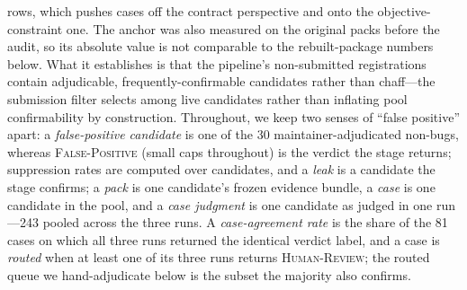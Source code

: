 \documentclass[acmsmall,screen,review,anonymous]{acmart}
\begin{document}
rows, which pushes cases off the contract perspective and onto the objective-constraint one. The anchor was also measured on the original packs before the audit, so its absolute value is not comparable to the rebuilt-package numbers below. What it establishes is that the pipeline's non-submitted registrations contain adjudicable, frequently-confirmable candidates rather than chaff---the submission filter selects among live candidates rather than inflating pool confirmability by construction. Throughout, we keep two senses of ``false positive'' apart: a \emph{false-positive candidate} is one of the 30 maintainer-adjudicated non-bugs, whereas \textsc{False-Positive} (small caps throughout) is the verdict the stage returns; suppression rates are computed over candidates, and a \emph{leak} is a candidate the stage confirms; a \emph{pack} is one candidate's frozen evidence bundle, a \emph{case} is one candidate in the pool, and a \emph{case judgment} is one candidate as judged in one run---243 pooled across the three runs. A \emph{case-agreement rate} is the share of the 81 cases on which all three runs returned the identical verdict label, and a case is \emph{routed} when at least one of its three runs returns \textsc{Human-Review}; the routed queue we hand-adjudicate below is the subset the majority also confirms.
\end{document}
